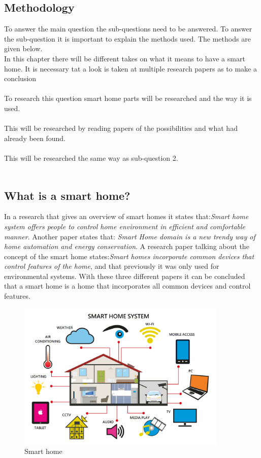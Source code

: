 \subsection{Methodology}
To answer the main question the sub-questions need to be answered. To answer the sub-question it is important to explain the methods used. The methods are given below.\\
In this chapter there will be different takes on what it means to have a smart home. It is necessary tat a look is taken at multiple research papers as to make a conclusion\\\\
To research this question smart home parts will be researched and the way it is used.\\\\
This will be researched by reading papers of the possibilities and what had already been found.\\\\
This will be researched the same way as sub-question 2.\\\\

\subsection{What is a smart home?}
In a research\cite{SmartHomecompare} that gives an overview of smart homes it states that:\textit{Smart home system offers people to control home environment in efficient and comfortable manner}. Another paper\cite{SmartHome_review} states that: \textit{Smart Home domain is a new trendy way of home automation and energy conservation}. A research paper\cite{SmartHomeTech} talking about the concept of the smart home states:\textit{Smart homes incorporate
common devices that control features of the home}, and that previously it was only used for environmental systems. With these three different papers it can be concluded that a smart home is a home that incorporates all common devices and control features.

\begin{figure}[H]
    \centering
    \includegraphics[width=10cm]{Images/Research/smart-home-01.jpg}
    \caption{Smart home}
    \label{fig:Smart_home}
\end{figure}

